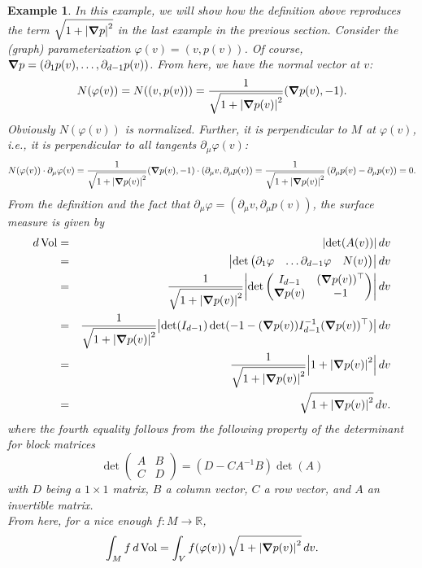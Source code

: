 \documentclass{article}
\renewcommand\det{\operatorname{det}}
\newcommand{\p}{\partial}
\newcommand{\R}{\mathbb{R}}
\newcommand{\lp}{\left(}
\newcommand{\rp}{\right)}
\theoremstyle{theorem}
\newtheorem{example}[theorem]{Example}
\newcommand{\Vol}{\operatorname{Vol}}
\begin{document}
\begin{example}
In this example, we will show how the definition above reproduces the term $\sqrt{1 + \abs{\grad p}^2}$ in the last example in the previous section. Consider the (graph) parameterization $\varphi(v) = (v,p(v))$. Of course, $\grad p  = (\p_1 p(v),\dots,\p_{d-1} p(v))$. From here, we have the normal vector at $v$:
\begin{equation*}
    N(\varphi(v)) = N((v,p(v))) = \frac{1}{\sqrt{1+ \abs{\grad p(v)}^2}} (\grad p(v), -1).
\end{equation*}
Obviously $N(\varphi(v))$ is normalized. Further, it is perpendicular to $M$ at $\varphi(v)$, i.e., it is perpendicular to all tangents $\p_\mu\varphi(v)$: 
\begin{equation*}
    N(\varphi(v))\cdot \p_\mu \varphi(v) = \frac{1}{\sqrt{1+ \abs{\grad p(v)}^2}} ( \grad p(v), -1 ) \cdot ( \p_\mu v, \p_\mu p(v) ) = \frac{1}{\sqrt{1+ \abs{\grad p(v)}^2}}\lp \p_\mu p(v) - \p_\mu p(v) \rp = 0.
\end{equation*}
From the definition and the fact that $\p_\mu \varphi = (\p_\mu v, \p_\mu p(v))$, the surface measure is given by 
\begin{eqnarray*}
    d\Vol &=& \abs{\det(A(v))}\,dv \\ 
    &=& \abs{\det
    \begin{pmatrix}
    \p_1\varphi & \dots \p_{d-1}\varphi & N(v)
    \end{pmatrix}
    } \,dv\\
    &=& \frac{1}{\sqrt{1+ \abs{\grad p(v)}^2}} \abs{\det
    \begin{pmatrix}
    I_{d-1} & (\grad p(v))^\top \\
    \grad p(v) & -1
    \end{pmatrix}
    }\,dv \\
    &=& \frac{1}{\sqrt{1+ \abs{\grad p(v)}^2}} \abs{\det(I_{d-1})\det(-1 - (\grad p(v))I_{d-1}^{-1} (\grad p(v))^\top)}\,dv \\ 
    &=& \frac{1}{\sqrt{1+ \abs{\grad p(v)}^2}} \abs{1 + \abs{\grad p(v)}^2 }\,dv \\
    &=& \sqrt{1+ \abs{\grad p(v)}^2} \,dv.
\end{eqnarray*}
where the fourth equality follows from the following property of the determinant for block matrices
\begin{equation*}
    \det\begin{pmatrix}
    A & B \\ C & D
    \end{pmatrix}
    = (D - CA^{-1}B)\det(A)
\end{equation*}
with $D$ being a $1\times 1$ matrix, $B$ a column vector, $C$ a row vector, and $A$ an invertible matrix. \\

From here, for a nice enough $f:M\to \R$, 
\begin{equation*}
    \int_M f\,d\Vol = \int_V f(\varphi(v))\, \sqrt{1+ \abs{\grad p(v)}^2}\,dv.
\end{equation*}
\end{example}
\end{document}

